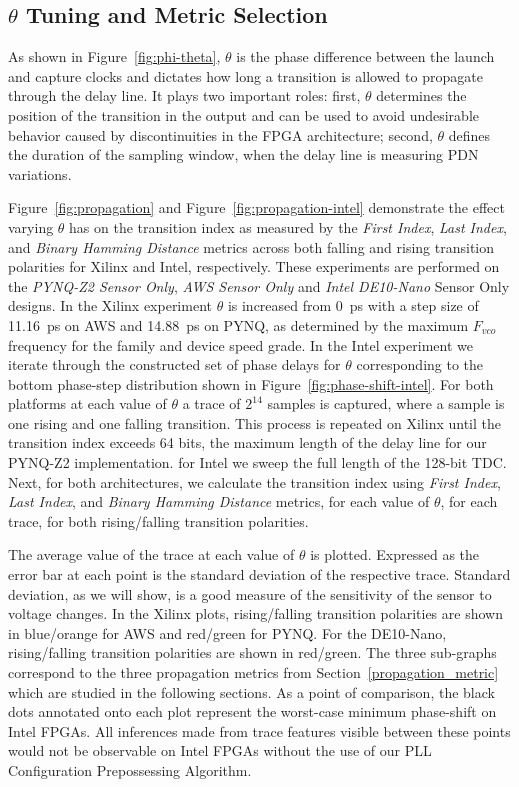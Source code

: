 


\subsection{$\theta$ Tuning and Metric Selection}
\label{capture_clock_tuning}

As shown in Figure~\ref{fig:phi-theta}, $\theta$ is the phase difference between the launch and capture clocks and dictates how long a transition is allowed to propagate through the delay line. It plays two important roles: first, $\theta$ determines the position of the transition in the output and can be used to avoid undesirable behavior caused by discontinuities in the FPGA architecture; second, $\theta$ defines the duration of the sampling window, when the delay line is measuring PDN variations.

Figure~\ref{fig:propagation} and Figure~\ref{fig:propagation-intel} demonstrate the effect varying $\theta$ has on the transition index as measured by the \textit{First Index}, \textit{Last Index}, and \textit{Binary Hamming Distance} metrics across both falling and rising transition polarities for Xilinx and Intel, respectively.
These experiments are performed on the {\it PYNQ-Z2 Sensor Only}, {\it AWS Sensor Only} and {\it Intel DE10-Nano} Sensor Only designs. In the Xilinx experiment $\theta$ is increased from 0~ps with a step size of 11.16~ps on AWS and 14.88~ps on PYNQ, as determined by the maximum $F_{vco}$ frequency for the family and device speed grade. In the Intel experiment we iterate through the constructed set of phase delays for $\theta$ corresponding to the bottom phase-step distribution shown in Figure~\ref{fig:phase-shift-intel}. For both platforms at each value of $\theta$ a trace of $2^{14}$ samples is captured, where a sample is one rising and one falling transition. This process is repeated on Xilinx until the transition index exceeds 64 bits, the maximum length of the delay line for our PYNQ-Z2 implementation. for Intel we sweep the full length of the 128-bit TDC. Next, for both architectures, we calculate the transition index using \textit{First Index}, \textit{Last Index}, and \textit{Binary Hamming Distance} metrics, for each value of $\theta$, for each trace, for both rising/falling transition polarities.

The average value of the trace at each value of $\theta$ is plotted. Expressed as the error bar at each point is the standard deviation of the respective trace. Standard deviation, as we will show, is a good measure of the sensitivity of the sensor to voltage changes. In the Xilinx plots, rising/falling transition polarities are shown in blue/orange for AWS and red/green for PYNQ. For the DE10-Nano, rising/falling transition polarities are shown in red/green. The three sub-graphs correspond to the three propagation metrics from Section~\ref{propagation_metric} which are studied in the following sections. As a point of comparison, the black dots annotated onto each plot represent the worst-case minimum phase-shift on Intel FPGAs. All inferences made from trace features visible between these points would not be observable on Intel FPGAs without the use of our PLL Configuration Prepossessing Algorithm.

